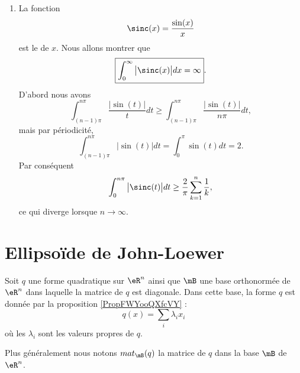 \begin{enumerate}
    \item

        La fonction 
        \begin{equation}
            \sinc(x)=\frac{ \sin(x) }{ x }
        \end{equation}
        est le  de \( x\). Nous allons montrer que
        \begin{equation}    \label{EqKNOmLEd}
            \boxed{  \int_0^{\infty}\big| \sinc(x) \big|dx=\infty  }.
        \end{equation}
        D'abord nous avons
        \begin{equation}
            \int_{(n-1)\pi}^{n\pi}\frac{ \big| \sin(t) \big| }{ t }dt\geq \int_{(n-1)\pi}^{n\pi}\frac{ \big| \sin(t) \big| }{ n\pi }dt,
        \end{equation}
        mais par périodicité,
        \begin{equation}
            \int_{(n-1)\pi}^{n\pi}\big| \sin(t) \big|dt=\int_0^{\pi}\sin(t)dt=2.
        \end{equation}
        Par conséquent
        \begin{equation}
            \int_0^{n\pi}\big| \sinc(t) \big|dt\geq \frac{ 2 }{ \pi }\sum_{k=1}^n\frac{1}{ k },
        \end{equation}
        ce qui diverge lorsque \( n\to \infty\).

\end{enumerate}

\section{Ellipsoïde de John-Loewer}

Soit \( q\) une forme quadratique sur \( \eR^n\) ainsi que \( \mB\) une base orthonormée de \( \eR^n\) dans laquelle la matrice de  \( q\) est diagonale. Dans cette base, la forme \( q\) est donnée par la proposition \ref{PropFWYooQXfcVY} :
\begin{equation}
    q(x)=\sum_i\lambda_ix_i
\end{equation}
où les \( \lambda_i\) sont les valeurs propres de \( q\).

Plus généralement nous notons \( mat_{\mB}(q)\) la matrice de \( q\) dans la base \( \mB\) de \( \eR^n\).

